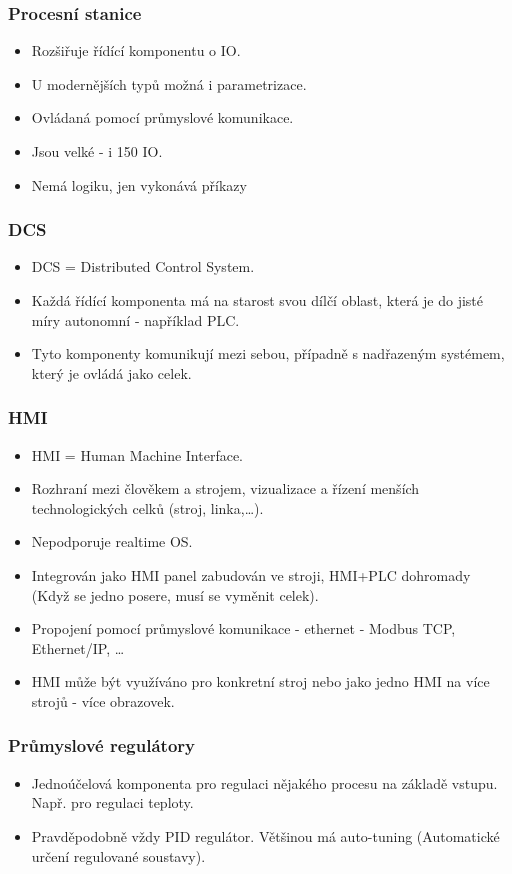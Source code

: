 \subsubsection*{Procesní stanice}
\begin{itemize}
    \item Rozšiřuje řídící komponentu o IO.
    \item U modernějších typů možná i parametrizace.
    \item Ovládaná pomocí průmyslové komunikace.
    \item Jsou velké - i 150 IO.
    \item Nemá logiku, jen vykonává příkazy
\end{itemize}

\subsubsection*{DCS}
\begin{itemize}
    \item DCS = Distributed Control System.
    \item Každá řídící komponenta má na starost svou dílčí oblast, která je do jisté míry autonomní - například PLC.
    \item Tyto komponenty komunikují mezi sebou, případně s nadřazeným systémem, který je ovládá jako celek.
\end{itemize}

\subsubsection*{HMI}
\begin{itemize}
    \item HMI = Human Machine Interface.
    \item Rozhraní mezi člověkem a strojem, vizualizace a řízení menších technologických celků (stroj, linka,\dots).
    \item Nepodporuje realtime OS.
    \item Integrován jako HMI panel zabudován ve stroji, HMI+PLC dohromady (Když se jedno posere, musí se vyměnit celek).
    \item Propojení pomocí průmyslové komunikace - ethernet - Modbus TCP, Ethernet/IP, \dots
    \item HMI může být využíváno pro konkretní stroj nebo jako jedno HMI na více strojů - více obrazovek.
\end{itemize}

\subsubsection*{Průmyslové regulátory}
\begin{itemize}
    \item Jednoúčelová komponenta pro regulaci nějakého procesu na základě vstupu. Např. pro regulaci teploty.
    \item Pravděpodobně vždy PID regulátor. Většinou má auto-tuning (Automatické určení regulované soustavy).
\end{itemize}

